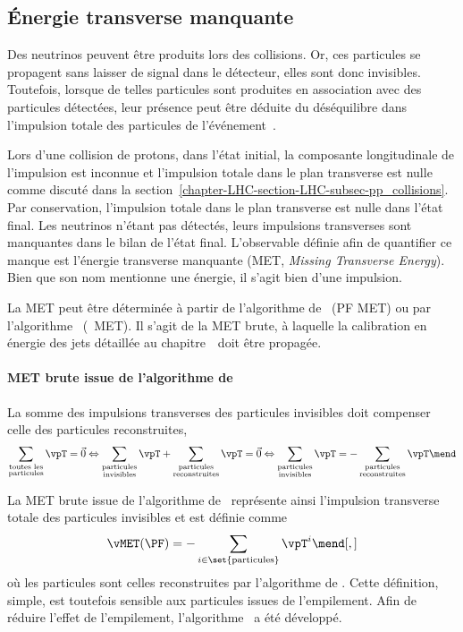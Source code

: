 \subsection{Énergie transverse manquante}\label{chapter-CMS-section-MET}
Des neutrinos peuvent être produits lors des collisions.
Or, ces particules se propagent sans laisser de signal dans le détecteur, elles sont donc invisibles.
Toutefois, lorsque de telles particules sont produites en association avec des particules détectées, leur présence peut être déduite du déséquilibre dans l'impulsion totale des particules de l'événement~\cite{CMS-PAS-JME-17-001}.
\par
Lors d'une collision de protons, dans l'état initial,
la composante longitudinale de l'impulsion est inconnue
et
l'impulsion totale dans le plan transverse est nulle
comme discuté dans la section~\ref{chapter-LHC-section-LHC-subsec-pp_collisions}.
Par conservation, l'impulsion totale dans le plan transverse est nulle dans l'état final.
Les neutrinos n'étant pas détectés, leurs impulsions transverses sont manquantes dans le bilan de l'état final.
L'observable définie afin de quantifier ce manque est
l'énergie transverse manquante (MET, \emph{Missing Transverse Energy}).
Bien que son nom mentionne une énergie, il s'agit bien d'une impulsion.
\par
La MET peut être déterminée à partir de l'algorithme de \PF\ (PF MET)
ou
par l'algorithme \PUPPI\ (\PUPPI\ MET).
Il s'agit de la MET brute, à laquelle la calibration en énergie des jets détaillée au chapitre~\ doit être propagée.
\paragraph{MET brute issue de l'algorithme de \PF}
La somme des impulsions transverses des particules invisibles doit compenser celle des particules reconstruites, \ie
\begin{equation}
\sum_{\substack{\text{toutes les}\\\text{particules}}} \vpT = \vec{0}
\Leftrightarrow
\sum_{\substack{\text{particules}\\\text{invisibles}}} \vpT + \sum_{\substack{\text{particules}\\\text{reconstruites}}} \vpT = \vec{0}
\Leftrightarrow
\sum_{\substack{\text{particules}\\\text{invisibles}}} \vpT = -\sum_{\substack{\text{particules}\\\text{reconstruites}}} \vpT \mend
\end{equation}
\par La MET brute issue de l'algorithme de \PF\ représente ainsi l'impulsion transverse totale des particules invisibles et est définie comme
\begin{equation}
\vMET(\text{\PF}) = -\sum_{i\in\set{\text{particules}}} \vpT^{i}
\mend[,]
\end{equation}
où les particules sont celles reconstruites par l'algorithme de \PF.
Cette définition, simple, est toutefois sensible aux particules issues de l'empilement.
Afin de réduire l'effet de l'empilement, l'algorithme \PUPPI\ a été développé.
